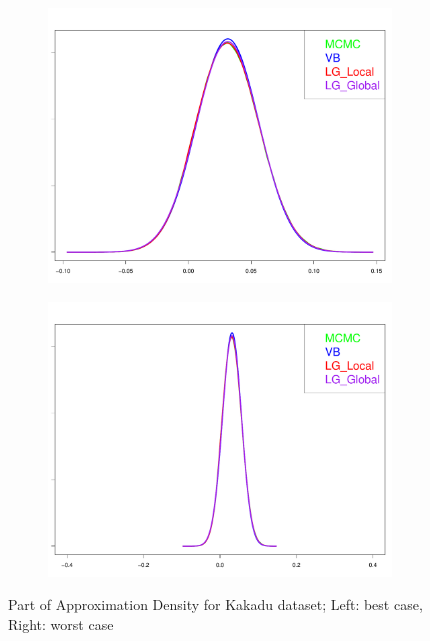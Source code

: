 \begin{figure}[h]
	\begin{subfigure}{0.5\textwidth}
		\centering
		\includegraphics[page = 1, width=\linewidth,keepaspectratio]{lasso_densities_Kakadu.pdf}
	\end{subfigure}
	\begin{subfigure}{0.5\textwidth}
		\includegraphics[page = 2, width=\linewidth,keepaspectratio]{lasso_densities_Kakadu-1.pdf}
	\end{subfigure}
	\caption{Part of Approximation Density for Kakadu dataset; Left: best case, Right: worst case}
	\label{fig:Kakadu}
\end{figure}

